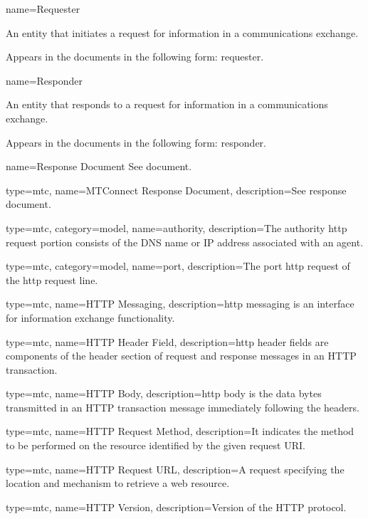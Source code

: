 {
  name={Requester}
}
{
	An entity that initiates a \gls{request} for information in a communications exchange.

	Appears in the documents in the following form: \gls{requester}.
}


{
  name={Responder}
}
{
	An entity that responds to a \gls{request} for information in a communications exchange.

	Appears in the documents in the following form: \gls{responder}.
}


{
  name={Response Document}
}
{
	See \gls{document}.
}

{
  type=mtc,
  name={MTConnect Response Document},
  description={See \gls{response document}.}
}

{
  type=mtc,
  category=model,
  name={authority},
  description={The \gls{authority http request} portion consists of the DNS name or IP address associated with an \gls{agent}.}
}

{
  type=mtc,
  category=model,
  name={port},
  description={The \gls{port http request} of the \gls{http request line}.}
}

{
  type=mtc,
  name={HTTP Messaging},
  description={\gls{http messaging} is an interface for information exchange functionality.}
}

{
  type=mtc,
  name={HTTP Header Field},
  description={\glspl{http header field} are components of the header section of request and response messages in an HTTP transaction.}
}

{
  type=mtc,
  name={HTTP Body},
  description={\gls{http body} is the data bytes transmitted in an HTTP transaction message immediately following the headers.}
}

{
  type=mtc,
  name={HTTP Request Method},
  description={It indicates the method to be performed on the resource identified by the given request URI.}
}

{
  type=mtc,
  name={HTTP Request URL},
  description={A request specifying the location and mechanism to retrieve a web resource.}
}

{
  type=mtc,
  name={HTTP Version},
  description={Version of the HTTP protocol.}
}


